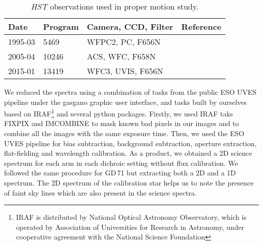 \documentclass[fleqn,usenatbib]{mnras}
\begin{document}
\begin{table}
  \caption{\textit{HST} observations used in proper motion study.}
  \label{tab:programs}
  \setlength\tabcolsep{1ex}
  \begin{tabular}{llll}
    \toprule
    Date & Program & Camera, CCD, Filter & Reference \\
    \midrule
    1995-03 & 5469 & WFPC2, PC, F656N & \citet{Bally:1998a} \\
    2005-04 & 10246 & ACS, WFC, F658N & \citet{Robberto:2013a} \\
    2015-01 & 13419 & WFC3, UVIS, F656N & \citet{Bally:2018c} \\
    \bottomrule
  \end{tabular}
\end{table}

We reduced the spectra using a combination of tasks from the public ESO UVES pipeline  \citep{Ballester00} under the {\sc gasgano} graphic user interface, and tasks built by ourselves based on IRAF\footnote{IRAF is distributed by National Optical Astronomy Observatory, which is operated by Association of Universities for Research in Astronomy, under cooperative agreement with the National Science Foundation} \citep{Tody93} and several python packages. Firstly, we used IRAF taks FIXPIX and IMCOMBINE to mask known bad pixels in our images and to combine all the images with the same exposure time. Then, we used the ESO UVES pipeline for bias subtraction, background subtraction, aperture extraction, flat-fielding and wavelength calibration. As a product, we obtained a 2D science spectrum for each arm in each dichroic setting without flux calibration. We followed the same procedure for GD\,71 but extracting both a 2D and a 1D spectrum. The 2D spectrum of the calibration star helps us to note the presence of faint sky lines which are also present in the science spectra.
 
\end{document}

